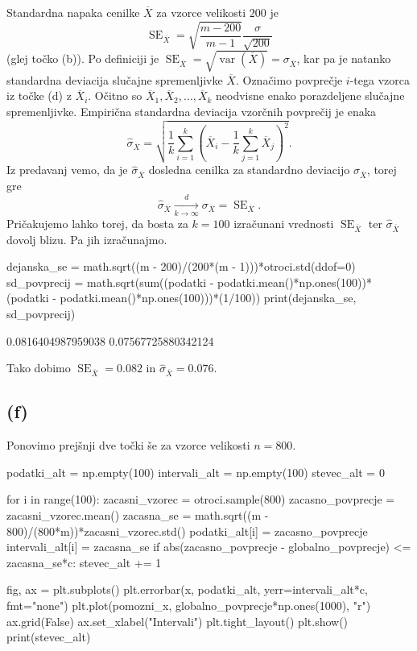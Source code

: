 \documentclass[10pt, a4paper]{article}
\DeclareMathOperator{\var}{var}
\DeclareMathOperator{\se}{SE}
\begin{document}
Standardna napaka cenilke $\overline{X}$ za vzorce velikosti $200$ je 
$$\se_{\overline{X}} = \sqrt{\frac{m - 200}{m - 1}} \frac{\sigma}{\sqrt{200}}$$
(glej točko (b)). Po definiciji je $\se_{\overline{X}} = \sqrt{\var(\overline{X})} = \sigma_{\overline{X}}$,
kar pa je natanko standardna deviacija slučajne spremenljivke $\overline{X}$.
Označimo povprečje $i$-tega vzorca iz točke (d) z $\overline{X}_i$.
Očitno so $\overline{X}_1, \overline{X}_2, \dots, \overline{X}_k$ neodvisne enako porazdeljene slučajne spremenljivke.
Empirična standardna deviacija vzorčnih povprečij je enaka
$$\widehat{\sigma}_{\overline{X}} = \sqrt{\frac{1}{k} \sum_{i = 1} ^{k} \left(\overline{X}_i - \frac{1}{k}\sum_{j = 1} ^k \overline{X}_j\right)^2}.$$
Iz predavanj vemo, da je $\widehat{\sigma}_{\overline{X}}$ dosledna cenilka za standardno deviacijo 
$\sigma_{\overline{X}}$, torej gre $$\widehat{\sigma}_{\overline{X}} \xrightarrow[k \to \infty]{d} {\sigma_{\overline{X}}} = \se_{\overline{X}}.$$
Pričakujemo lahko torej, da bosta za $k = 100$ izračunani vrednosti $\se_{\overline{X}}$ ter $\widehat{\sigma}_{\overline{X}}$ dovolj blizu.
Pa jih izračunajmo.

\begin{python}
    dejanska_se = math.sqrt((m - 200)/(200*(m - 1)))*otroci.std(ddof=0)
    sd_povprecij = math.sqrt(sum((podatki - podatki.mean()*np.ones(100))*(podatki - podatki.mean()*np.ones(100)))*(1/100))
    print(dejanska_se, sd_povprecij)
\end{python}

\begin{python}
    0.0816404987959038 0.07567725880342124
\end{python}

Tako dobimo $\se_{\overline{X}} = 0.082$ in $\widehat{\sigma}_{\overline{X}} = 0.076$.

\subsection*{(f)}

Ponovimo prejšnji dve točki še za vzorce velikosti $n = 800$.

\begin{python}
    podatki_alt = np.empty(100)
    intervali_alt = np.empty(100)
    stevec_alt = 0

    for i in range(100):
        zacasni_vzorec = otroci.sample(800)
        zacasno_povprecje = zacasni_vzorec.mean()
        zacasna_se = math.sqrt((m - 800)/(800*m))*zacasni_vzorec.std()
        podatki_alt[i] = zacasno_povprecje
        intervali_alt[i] = zacasna_se
        if abs(zacasno_povprecje - globalno_povprecje) <= zacasna_se*c:
            stevec_alt += 1

    fig, ax = plt.subplots()
    plt.errorbar(x, podatki_alt, yerr=intervali_alt*c, fmt="none")
    plt.plot(pomozni_x, globalno_povprecje*np.ones(1000), "r")
    ax.grid(False)
    ax.set_xlabel("Intervali")
    plt.tight_layout()
    plt.show()
    print(stevec_alt)
\end{python}
\end{document}
